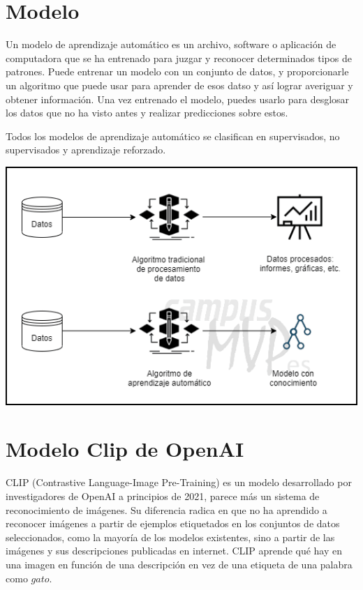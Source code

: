 \documentclass[runningheads,a4paper]{llncs}
\begin{document}
\section{Modelo}

Un modelo de aprendizaje autom\'atico es un archivo, software o aplicaci\'on de computadora que se ha entrenado para juzgar y reconocer determinados tipos de patrones. Puede entrenar un modelo con un conjunto de datos, y proporcionarle un algoritmo que puede usar para aprender de esos datso y as\'i lograr averiguar y obtener informaci\'on. Una vez entrenado el modelo, puedes usarlo para desglosar los datos que no ha visto antes y realizar predicciones sobre estos.

Todos los modelos de aprendizaje autom\'atico se clasifican en supervisados, no supervisados ​​y aprendizaje reforzado.

\begin{center}
\includegraphics[scale=0.5]{img/image.png}
 \cite{link10}
\end{center}

 
 \newpage
\section{Modelo Clip de OpenAI}

CLIP (Contrastive Language-Image Pre-Training) es un modelo desarrollado por investigadores de OpenAI a principios de 2021, parece m\'as un sistema de reconocimiento de im\'agenes. Su diferencia radica en que no ha aprendido a reconocer im\'agenes a partir de ejemplos etiquetados en los conjuntos de datos seleccionados, como la mayor\'ia de los modelos existentes, sino a partir de las im\'agenes y sus descripciones publicadas en internet. CLIP aprende qu\'e hay en una imagen en funci\'on de una descripci\'on en vez de una etiqueta de una palabra como $gato$.\\
\end{document}
